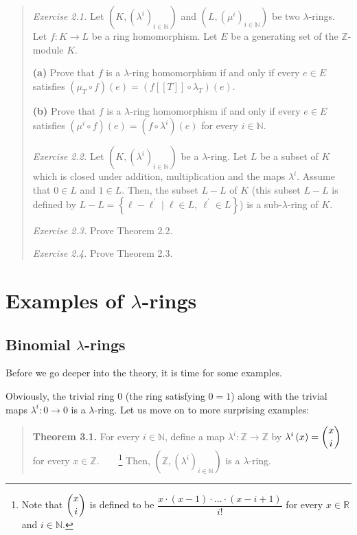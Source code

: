 \documentclass[numbers=enddot,12pt,final,onecolumn,notitlepage]{scrartcl}%
\begin{document}
\begin{quotation}
\textit{Exercise 2.1.} Let $\left(  K,\left(  \lambda^{i}\right)
_{i\in\mathbb{N}}\right)  $ and $\left(  L,\left(  \mu^{i}\right)
_{i\in\mathbb{N}}\right)  $ be two $\lambda$-rings. Let $f:K\rightarrow L$ be
a ring homomorphism. Let $E$ be a generating set of the $\mathbb{Z}$-module
$K$.

\textbf{(a)} Prove that $f$ is a $\lambda$-ring homomorphism if and only if
every $e\in E$ satisfies $\left(  \mu_{T}\circ f\right)  \left(  e\right)
=\left(  f\left[  \left[  T\right]  \right]  \circ\lambda_{T}\right)  \left(
e\right)  $.

\textbf{(b)} Prove that $f$ is a $\lambda$-ring homomorphism if and only if
every $e\in E$ satisfies $\left(  \mu^{i}\circ f\right)  \left(  e\right)
=\left(  f\circ\lambda^{i}\right)  \left(  e\right)  $ for every
$i\in\mathbb{N}$.

\textit{Exercise 2.2.} Let $\left(  K,\left(  \lambda^{i}\right)
_{i\in\mathbb{N}}\right)  $ be a $\lambda$-ring. Let $L$ be a subset of $K$
which is closed under addition, multiplication and the maps $\lambda^{i}$.
Assume that $0\in L$ and $1\in L$. Then, the subset $L-L$ of $K$ (this subset
$L-L$ is defined by $L-L=\left\{  \ell-\ell^{\prime}\mid\ell\in L,\ \ell
^{\prime}\in L\right\}  $) is a sub-$\lambda$-ring of $K$.

\textit{Exercise 2.3.} Prove Theorem 2.2.

\textit{Exercise 2.4.} Prove Theorem 2.3.
\end{quotation}

\section{Examples of $\lambda$-rings}

\subsection{Binomial $\lambda$-rings}

Before we go deeper into the theory, it is time for some examples.

Obviously, the trivial ring $0$ (the ring satisfying $0=1$) along with the
trivial maps $\lambda^{i}:0\rightarrow0$ is a $\lambda$-ring. Let us move on
to more surprising examples:

\begin{quote}
\textbf{Theorem 3.1.} For every $i\in\mathbb{N}$, define a map $\lambda
^{i}:\mathbb{Z}\rightarrow\mathbb{Z}$ by $\lambda^{i}\left(  x\right)
=\dbinom{x}{i}$ for every $x\in\mathbb{Z}$.\ \ \ \ \footnote{Note that
$\dbinom{x}{i}$ is defined to be $\dfrac{x\cdot\left(  x-1\right)
\cdot...\cdot\left(  x-i+1\right)  }{i!}$ for every $x\in\mathbb{R}$ and
$i\in\mathbb{N}$.} Then, $\left(  \mathbb{Z},\left(  \lambda^{i}\right)
_{i\in\mathbb{N}}\right)  $ is a $\lambda$-ring.
\end{quote}
\end{document}
